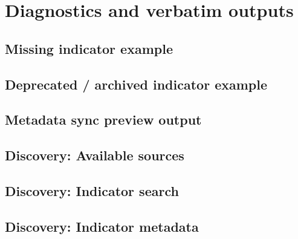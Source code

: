 \documentclass[bib]{statapress}
\begin{document}
\section{Diagnostics and verbatim outputs}\label{app:diagnostics}

\subsection{Missing indicator example}
\begin{stlog}
\nullskip
\end{stlog}

\subsection{Deprecated / archived indicator example}
\begin{stlog}
\nullskip
\end{stlog}

\subsection{Metadata sync preview output}
\begin{stlog}
\nullskip
\end{stlog}

\subsection{Discovery: Available sources}\label{app:diagnostics:sources}
\begin{stlog}
\nullskip
\end{stlog}

\subsection{Discovery: Indicator search}\label{app:diagnostics:search}
\begin{stlog}
\nullskip
\end{stlog}

\subsection{Discovery: Indicator metadata}\label{app:diagnostics:info}
\begin{stlog}
\nullskip
\end{stlog}
\end{document}
